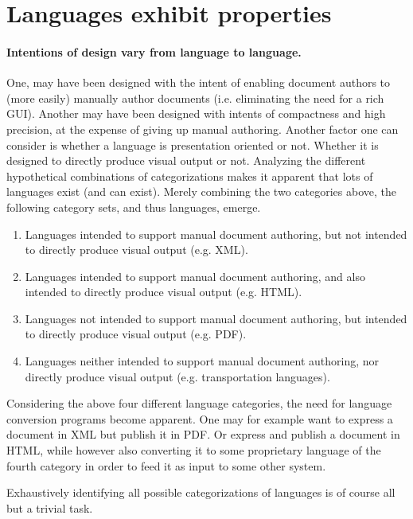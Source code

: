 \documentclass{scrreprt}
\begin{document}
\section{Languages exhibit properties}
\paragraph{Intentions of design vary from language to language.} One, may have been designed with the intent of enabling document authors to (more easily) manually author documents (i.e. eliminating the need for a rich GUI). Another may have been designed with intents of compactness and high precision, at the expense of giving up manual authoring. Another factor one can consider is whether a language is presentation oriented or not. Whether it is designed to directly produce visual output or not. Analyzing the different hypothetical combinations of categorizations makes it apparent that lots of languages exist (and can exist). Merely combining the two categories above, the following category sets, and thus languages, emerge.

\begin{enumerate}
\item Languages intended to support manual document authoring, but not intended to directly produce visual output (e.g. XML).
\item Languages intended to support manual document authoring, and also intended to directly produce visual output (e.g. HTML).
\item Languages not intended to support manual document authoring, but intended to directly produce visual output (e.g. PDF).
\item Languages neither intended to support manual document authoring, nor directly produce visual output (e.g. transportation languages).
\end{enumerate}

Considering the above four different language categories, the need for language conversion programs become apparent. One may for example want to express a document in XML but publish it in PDF. Or express and publish a document in HTML, while however also converting it to some proprietary language of the fourth category in order to feed it as input to some other system.

Exhaustively identifying all possible categorizations of languages is of course all but a trivial task.
\end{document}
